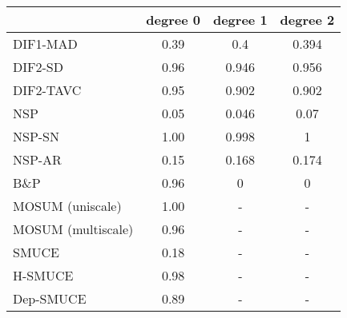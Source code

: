 \begin{tabular}{|l|c|c|c|}
  \hline
 & degree 0 & degree 1 & degree 2 \\ 
  \hline
DIF1-MAD & 0.39 & 0.4 & 0.394 \\ 
  DIF2-SD & 0.96 & 0.946 & 0.956 \\ 
  DIF2-TAVC & 0.95 & 0.902 & 0.902 \\ 
  NSP & 0.05 & 0.046 & 0.07 \\ 
  NSP-SN & 1.00 & 0.998 & 1 \\ 
  NSP-AR & 0.15 & 0.168 & 0.174 \\ 
  B\&P & 0.96 & 0 & 0 \\ 
  MOSUM (uniscale) & 1.00 & - & - \\ 
  MOSUM (multiscale) & 0.96 & - & - \\ 
  SMUCE & 0.18 & - & - \\ 
  H-SMUCE & 0.98 & - & - \\ 
  Dep-SMUCE & 0.89 & - & - \\ 
   \hline
\end{tabular}
